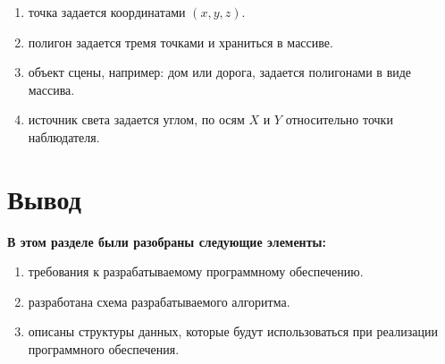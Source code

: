 \begin{enumerate}
	\item точка задается координатами $(x, y, z)$.
	\item полигон задается тремя точками и храниться в массиве.
	\item объект сцены, например: дом или дорога, задается полигонами в виде массива.
	\item источник света задается углом, по осям $X$ и $Y$ относительно точки наблюдателя. 
\end{enumerate}


\section{Вывод}
\textbf{В этом разделе были разобраны следующие элементы:}
\begin{enumerate}
\item требования к разрабатываемому программному обеспечению.
\item разработана схема разрабатываемого алгоритма.
\item описаны структуры данных, которые будут использоваться при реализации  программного обеспечения.
\end{enumerate}